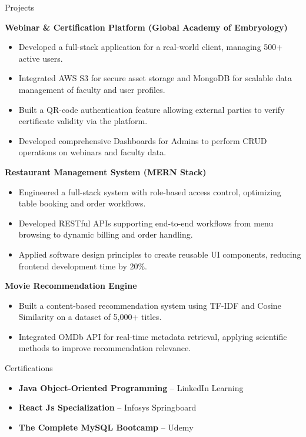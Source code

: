 \documentclass{resume} %
\begin{document}
\begin{rSection}{Projects}

\textbf{Webinar \& Certification Platform (Global Academy of Embryology)} 
\begin{itemize}
    \item Developed a full-stack application for a real-world client, managing 500+ active users.  
    
    \item Integrated AWS S3 for secure asset storage and MongoDB for scalable data management of faculty and user profiles.
    \item Built a QR-code authentication feature allowing external parties to verify certificate validity via the platform.
    \item Developed comprehensive Dashboards for Admins to perform CRUD operations on webinars and faculty data.
\end{itemize}

\textbf{Restaurant Management System (MERN Stack)} 
\begin{itemize}
    \item Engineered a full-stack system with role-based access control, optimizing table booking and order workflows.
    \item Developed RESTful APIs supporting end-to-end workflows from menu browsing to dynamic billing and order handling.
    \item Applied software design principles to create reusable UI components, reducing frontend development time by 20\%.
\end{itemize}

\textbf{Movie Recommendation Engine} 
\begin{itemize}
    \item Built a content-based recommendation system using TF-IDF and Cosine Similarity on a dataset of 5,000+ titles.
    \item Integrated OMDb API for real-time metadata retrieval, applying scientific methods to improve recommendation relevance.
\end{itemize}

\end{rSection}

\begin{rSection}{Certifications}
\begin{itemize}
    \item \textbf{Java Object-Oriented Programming} – LinkedIn Learning
    \item \textbf{React Js Specialization} – Infosys Springboard
    \item \textbf{The Complete MySQL Bootcamp} – Udemy
\end{itemize}
\end{rSection}
\end{document}
